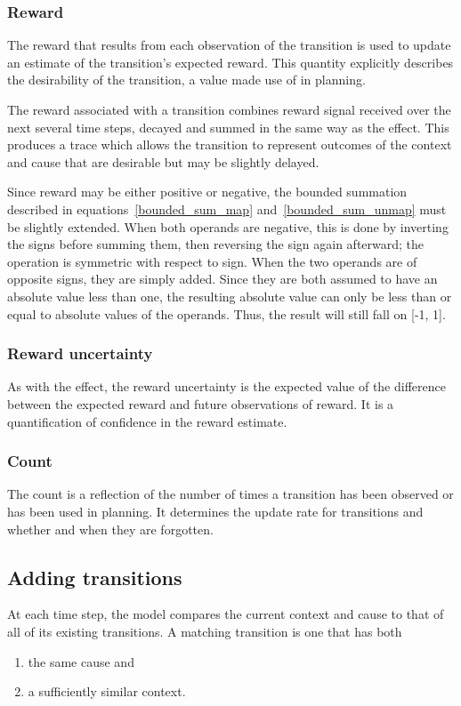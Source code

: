 \subsubsection{Reward}
The reward that results from each observation of the transition is used to update an estimate of the transition's expected reward. This quantity explicitly describes the desirability of the transition, a value made use of in planning.

The reward associated with a transition combines reward signal received over the next several time steps, decayed and summed in the same way as the effect. This produces a trace which allows the transition to represent outcomes of the context and cause that are desirable but may be slightly delayed. 

Since reward may be either positive or negative, the bounded summation described in equations~\ref{bounded_sum_map} and~\ref{bounded_sum_unmap} must be slightly extended. When both operands are negative, this is done by inverting the signs before summing them, then reversing the sign again afterward; the operation is symmetric with respect to sign. When the two operands are of opposite signs, they are simply added. Since they are both assumed to have an absolute value less than one, the resulting absolute value can only be less than or equal to absolute values of the operands. Thus, the result will still fall on [-1, 1].

\subsubsection{Reward uncertainty}
As with the effect, the reward uncertainty is the expected value of the difference between the expected reward and future observations of reward. It is a quantification of confidence in the reward estimate.

\subsubsection{Count}
The count is a reflection of the number of times a transition has been observed or has been used in planning. It determines the update rate for transitions and whether and when they are forgotten.

\subsection{Adding transitions}
At each time step, the model compares the current context and cause to that of all of its existing transitions.
A matching transition is one that has both 
\begin{enumerate}
\item the same cause and 
\item a sufficiently similar context.
\end{enumerate}

